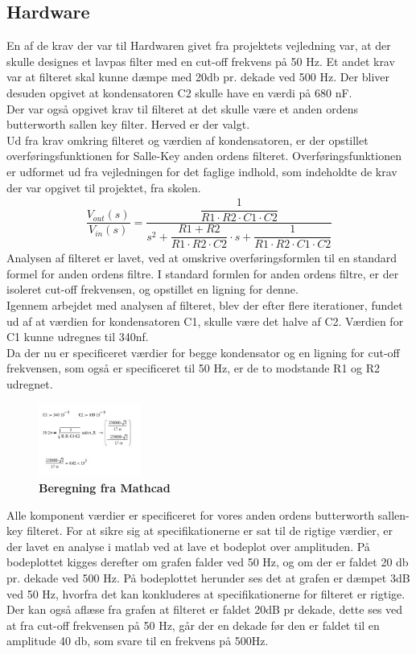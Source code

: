 \subsection{Hardware}
En af de krav der var til Hardwaren givet fra projektets vejledning var, at der skulle designes et lavpas filter med en cut-off frekvens på 50 Hz. Et andet krav var at filteret skal kunne dæmpe med 20db pr. dekade ved 500 Hz. Der bliver desuden opgivet at kondensatoren C2 skulle have en værdi på 680 nF. \\
Der var også opgivet krav til filteret at det skulle være et anden ordens butterworth sallen key filter. Herved er der valgt. \\
Ud fra krav omkring filteret og værdien af kondensatoren, er der opstillet overføringsfunktionen for Salle-Key anden ordens filteret. Overføringsfunktionen er udformet ud fra vejledningen for det faglige indhold, som indeholdte de krav der var opgivet til projektet, fra skolen.
\begin{align}
\dfrac{V_{out}(s)}{V_{in}(s)}=\dfrac{\dfrac{1}{R1\cdot R2\cdot C1\cdot C2}}{s^2+\dfrac{R1+R2}{R1\cdot R2\cdot C2}\cdot s+\dfrac{1}{R1\cdot R2\cdot C1\cdot C2}}
\end{align}
Analysen af filteret er lavet, ved at omskrive overføringsformlen til en standard formel for anden ordens filtre. I standard formlen for anden ordens filtre, er der isoleret cut-off frekvensen, og opstillet en ligning for denne. \\
Igennem arbejdet med analysen af filteret, blev der efter flere iterationer, fundet ud af at værdien for kondensatoren C1, skulle være det halve af C2. Værdien for C1 kunne udregnes til 340nf. \\
Da der nu er specificeret værdier for begge kondensator og en ligning for cut-off frekvensen, som også er specificeret til 50 Hz, er de to modstande R1 og R2 udregnet. 
\begin{figure}[H]
\includegraphics[width =0.3\textwidth , center]{billeder/mathcad2}
\caption{\textbf{Beregning fra Mathcad}}
\end{figure}
Alle komponent værdier er specificeret for vores anden ordens butterworth sallen-key filteret. For at sikre sig at specifikationerne er sat til de rigtige værdier, er der lavet en analyse i matlab ved at lave et bodeplot over amplituden. På bodeplottet kigges derefter om grafen falder ved 50 Hz, og om der er faldet 20 db pr. dekade ved 500 Hz. På bodeplottet herunder ses det at grafen er dæmpet 3dB ved 50 Hz, hvorfra det kan konkluderes at specifikationerne for filteret er rigtige. Der kan også aflæse fra grafen at filteret er faldet 20dB pr dekade, dette ses ved at fra cut-off frekvensen på 50 Hz, går der en dekade før den er faldet til en amplitude 40 db, som svare til en frekvens på 500Hz. 
